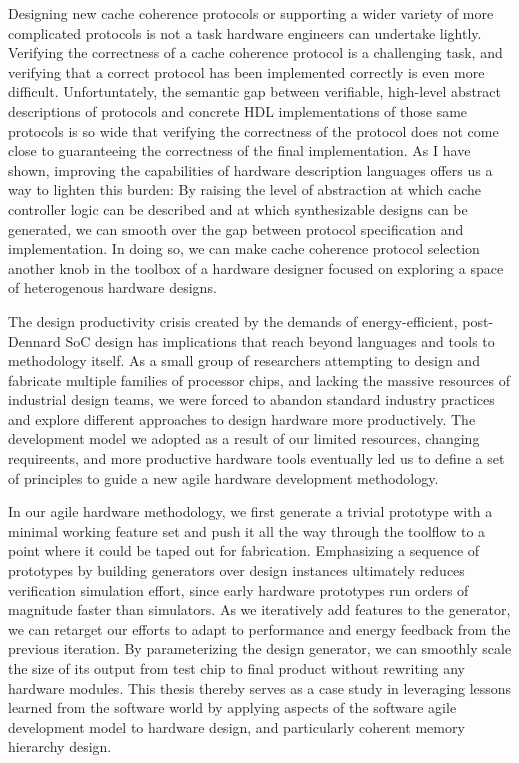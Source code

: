 Designing new cache coherence protocols or supporting a wider variety of more complicated protocols is not a task hardware engineers can undertake lightly.
Verifying the correctness of a cache coherence protocol is a challenging task, and
verifying that a correct protocol has been implemented correctly is even more difficult.
Unfortuntately, the semantic gap between verifiable, high-level abstract descriptions of protocols and 
concrete HDL implementations of those same protocols is so wide that verifying the correctness of the protocol
does not come close to guaranteeing the correctness of the final implementation.
As I have shown, improving the capabilities of hardware description languages offers us a way to lighten this burden:
By raising the level of abstraction at which cache controller logic can be described and at which synthesizable designs can be generated,
we can smooth over the gap between protocol specification and implementation.
In doing so, we can make cache coherence protocol selection another knob in the toolbox of a hardware designer focused on exploring a space of heterogenous hardware designs.

The design productivity crisis created by the demands of energy-efficient, post-Dennard SoC design has implications that reach beyond
languages and tools to methodology itself.
As a small group of researchers attempting to design and fabricate multiple families of processor chips,
and lacking the massive resources of industrial design teams,
we were forced to abandon standard industry practices and explore different
approaches to design hardware more productively.
The development model we adopted as a result of our limited resources, changing requireents, and more productive hardware tools
eventually led us to define a set of principles to guide a new agile hardware development methodology.

In our agile hardware methodology, we first generate a trivial prototype with a minimal working feature set and push it all the way through the toolflow to a point where it could be taped out for fabrication.
Emphasizing a sequence of prototypes by building generators over design instances ultimately reduces verification simulation effort, 
since early hardware prototypes run orders of magnitude faster than simulators.
As we iteratively add features to the generator, we can retarget our efforts to adapt to performance and energy feedback from the previous iteration.
By parameterizing the design generator, we can smoothly scale the size of its output from test chip to final product without rewriting any hardware modules.
This thesis thereby serves as a case study in leveraging lessons learned from the software world by
applying aspects of the software agile development model to hardware design,
and particularly coherent memory hierarchy design.


